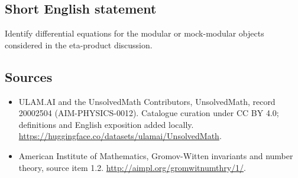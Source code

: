 \documentclass[11pt]{article}
\begin{document}
\subsection{Short English statement}
Identify differential equations for the modular or mock-modular objects considered in the eta-product discussion.
\subsection{Sources}
\begin{itemize}
\item[\hypertarget{source:20002504:1}{S1}] ULAM.AI and the UnsolvedMath Contributors, UnsolvedMath, record 20002504 (AIM-PHYSICS-0012). Catalogue curation under CC BY 4.0; definitions and English exposition added locally.
\url{https://huggingface.co/datasets/ulamai/UnsolvedMath}.
\item[\hypertarget{source:20002504:2}{S2}] American Institute of Mathematics, Gromov-Witten invariants and number theory, source item 1.2.
\url{http://aimpl.org/gromwitnumthry/1/}.
\end{itemize}
\label{end:20002504}
\end{document}
